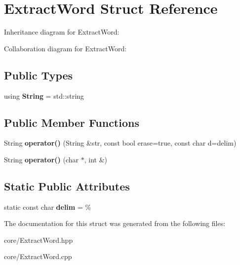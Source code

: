 \hypertarget{structExtractWord}{}\section{Extract\+Word Struct Reference}
\label{structExtractWord}


Inheritance diagram for Extract\+Word\+:


Collaboration diagram for Extract\+Word\+:
\subsection*{Public Types}
\begin{DoxyCompactItemize}
\item 
using {\bfseries String} = std\+::string\hypertarget{structExtractWord_ac60a6f2188f3f7289ab12bc0ccc4b275}{}\label{structExtractWord_ac60a6f2188f3f7289ab12bc0ccc4b275}

\end{DoxyCompactItemize}
\subsection*{Public Member Functions}
\begin{DoxyCompactItemize}
\item 
String {\bfseries operator()} (String \&str, const bool erase=true, const char d=delim)\hypertarget{structExtractWord_a35574d2d843834d5236d4643c680195e}{}\label{structExtractWord_a35574d2d843834d5236d4643c680195e}

\item 
String {\bfseries operator()} (char $\ast$, int \&)\hypertarget{structExtractWord_a3ee4959ee0394977ea5cf3e809744c20}{}\label{structExtractWord_a3ee4959ee0394977ea5cf3e809744c20}

\end{DoxyCompactItemize}
\subsection*{Static Public Attributes}
\begin{DoxyCompactItemize}
\item 
static const char {\bfseries delim} = \textquotesingle{}\%\textquotesingle{}\hypertarget{structExtractWord_a793bda68d7711e46c74f9008773e3178}{}\label{structExtractWord_a793bda68d7711e46c74f9008773e3178}

\end{DoxyCompactItemize}


The documentation for this struct was generated from the following files\+:\begin{DoxyCompactItemize}
\item 
core/Extract\+Word.\+hpp\item 
core/Extract\+Word.\+cpp\end{DoxyCompactItemize}
